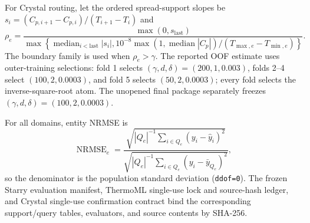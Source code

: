 For Crystal routing, let the ordered spread-support slopes be
$s_i=(C_{p,i+1}-C_{p,i})/(T_{i+1}-T_i)$ and
\begin{equation}
  \rho_e =
  \frac{\max(0,s_{\mathrm{last}})}
  {\max\!\left\{\operatorname{median}_{i<\mathrm{last}}|s_i|,
  10^{-8}\max(1,\operatorname{median}|C_p|)/(T_{\max,e}-T_{\min,e})\right\}}.
\end{equation}
The boundary family is used when $\rho_e>\gamma$.  The reported OOF estimate
uses outer-training selections: fold 1 selects
$(\gamma,d,\delta)=(200,1,0.003)$, folds 2--4 select
$(100,2,0.0003)$, and fold 5 selects $(50,2,0.0003)$; every fold selects the
inverse-square-root atom.
The unopened final package separately freezes
$(\gamma,d,\delta)=(100,2,0.0003)$.

For all domains, entity NRMSE is
\begin{equation}
 \operatorname{NRMSE}_e=
 \frac{\sqrt{|Q_e|^{-1}\sum_{i\in Q_e}(y_i-\hat y_i)^2}}
 {\sqrt{|Q_e|^{-1}\sum_{i\in Q_e}(y_i-\bar y_{Q_e})^2}},
\end{equation}
so the denominator is the population standard deviation (\texttt{ddof=0}).
The frozen Starry evaluation manifest, ThermoML single-use lock and source-hash
ledger, and Crystal single-use confirmation contract bind the corresponding
support/query tables, evaluators, and source contents by SHA-256.
